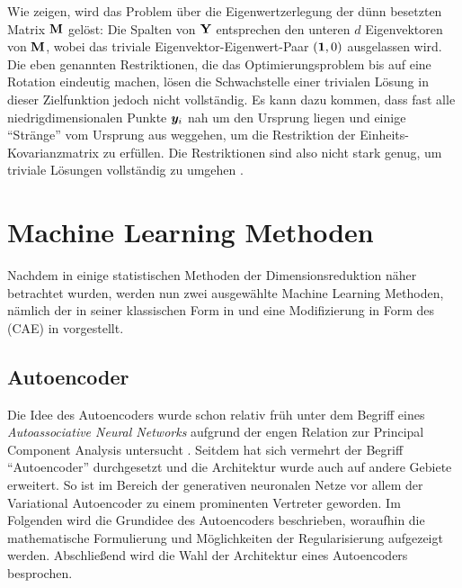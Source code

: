 Wie \textcite[3 -- 4]{Ghojogh.2020} zeigen, wird das Problem über die Eigenwertzerlegung der dünn
besetzten Matrix $\mathbf{M}$ gelöst: Die Spalten von $\mathbf{Y}$ entsprechen den unteren $d$
Eigenvektoren von $\mathbf{M}$, wobei das triviale Eigenvektor-Eigenwert-Paar $(\bm{1}, 0)$ ausgelassen
wird. Die eben genannten Restriktionen, die das Optimierungsproblem bis auf eine Rotation eindeutig
machen, lösen die Schwachstelle einer trivialen Lösung in dieser Zielfunktion jedoch nicht
vollständig. Es kann dazu kommen, dass fast alle niedrigdimensionalen Punkte $\bm{y}_i$ nah um
den Ursprung liegen und einige \enquote{Stränge} vom Ursprung aus weggehen, um die Restriktion der
Einheits-Kovarianzmatrix zu erfüllen. Die Restriktionen sind also nicht stark genug, um triviale
Lösungen vollständig zu umgehen \parencite[vgl.][23]{vanderMaaten.2009}.

\section{Machine Learning Methoden}
\label{ch:MethodenDerDimRed:modern}
Nachdem in  einige statistischen Methoden der
Dimensionsreduktion näher betrachtet wurden, werden nun zwei ausgewählte Machine Learning Methoden,
nämlich der  in seiner klassischen Form in
 und eine Modifizierung in Form des  (CAE) in  vorgestellt.

\subsection{Autoencoder}
\label{ch:MethodenDerDimRed:ML:AE}

Die Idee des Autoencoders wurde schon relativ früh unter dem Begriff eines \textit{Autoassociative
	Neural Networks} aufgrund der engen Relation zur Principal Component Analysis untersucht \parencites{Kramer.1991}{Kramer.1992}{Bourlard.1988}. Seitdem hat sich vermehrt der Begriff
\enquote{Autoencoder} durchgesetzt und die Architektur wurde auch auf andere Gebiete erweitert. So
ist im Bereich der generativen neuronalen Netze vor allem der Variational Autoencoder \parencite{Kingma.2013} zu einem prominenten Vertreter geworden. Im Folgenden wird die Grundidee des
Autoencoders beschrieben, woraufhin die mathematische Formulierung und Möglichkeiten der
Regularisierung aufgezeigt werden. Abschließend wird die Wahl der Architektur eines Autoencoders
besprochen.

